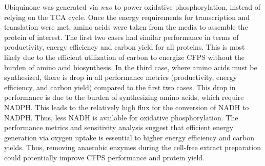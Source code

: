 \documentclass[journal=asbcd6,manuscript=article]{achemso}
\begin{document}
Ubiquinone was generated via \textit{nuo} to power oxidative phosphorylation, instead of relying on the TCA cycle.
Once the energy requirements for transcription and translation were met, amino acids were taken from the media to assemble the protein of interest.
The first two cases had similar performance in terms of productivity, energy efficiency and carbon yield for all proteins.
This is most likely due to the efficient utilization of carbon to energize CFPS without the burden of amino acid biosynthesis.
In the third case, where amino acids must be synthesized, there is drop in all performance metrics (productivity, energy efficiency, and carbon yield) compared to the first two cases.
This drop in performance is due to the burden of synthesizing amino acids, which require NADPH.
This leads to the relatively high flux for the conversion of NADH to NADPH.
Thus, less NADH is available for oxidative phosphorylation.
The performance metrics and sensitivity analysis suggest that efficient energy generation via oxygen uptake is essential to higher energy efficiency and carbon yields.
Thus, removing anaerobic enzymes during the cell-free extract preparation could potentially improve CFPS performance and protein yield.
\end{document}
